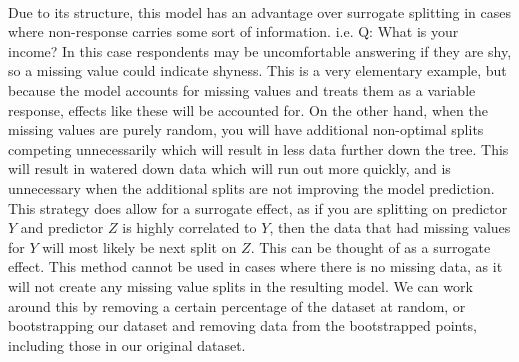 \documentclass[11pt]{article}
\begin{document}
\begin{center}

\ \\
\end{center}


\vspace{5 mm}
\noindent
Due to its structure, this model has an advantage over surrogate splitting in cases where non-response carries some sort of information.  i.e. Q: What is your income? In this case respondents may be uncomfortable answering if they are shy, so a missing value could indicate shyness.  This is a very elementary example, but because the model accounts for missing values and treats them as a variable response, effects like these will be accounted for.  On the other hand, when the missing values are purely random, you will have additional non-optimal splits competing unnecessarily which will result in less data further down the tree.  This will result in watered down data which will run out more quickly, and is unnecessary when the additional splits are not improving the model prediction.  This strategy does allow for a surrogate effect, as if you are splitting on predictor $Y$ and predictor $Z$ is highly correlated to $Y$, then the data that had missing values for $Y$ will most likely be next split on $Z$.  This can be thought of as a surrogate effect.  This method cannot be used in cases where there is no missing data, as it will not create any missing value splits in the resulting model.  We can work around this by removing a certain percentage of the dataset at random, or bootstrapping our dataset and removing data from the bootstrapped points, including those in our original dataset.
\end{document}
